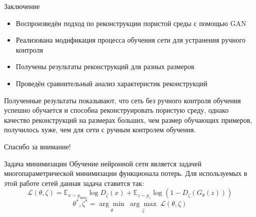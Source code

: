 \documentclass[12pt]{beamer}
\begin{document}
	\begin{frame}{Заключение}
		\begin{itemize}
			\item Воспроизведён подход по реконструкции пористой среды с помощью GAN
			\item Реализована модификация процесса обучения сети для устранения ручного контроля
			\item Получены результаты реконструкций для разных размеров
			\item Проведён сравнительный анализ характеристик реконструкций
		\end{itemize}
		Полученные результаты показывают, что сеть без ручного контроля обучения успешно обучается и способна реконструировать пористую среду, однако качество реконструкций на размерах больших, чем размер обучающих примеров, получилось хуже, чем для сети с ручным контролем обучения.
	\end{frame}
	
	\begin{frame}
		\centering\huge{Спасибо за внимание!}
	\end{frame}
	
	\begin{frame}{Задача минимизации}
		Обучение нейронной сети является задачей многопараметрической минимизации функционала потерь. Для используемых в этой работе сетей данная задача ставится так:
		 $$\mathcal{L}(\theta, \zeta) =  \mathbb{E}_{x \sim p_{data}}\log D_\zeta(x) + \mathbb{E}_{z \sim p_{z}} \log (1 - D_\zeta(G_\theta(z))) $$
		 $$\theta^*, \zeta^* = \underset{\theta}{\arg\min} \ \underset{\zeta}{\arg\max} \ \mathcal{L}(\theta, \zeta)$$
	\end{frame}
	
\end{document}
